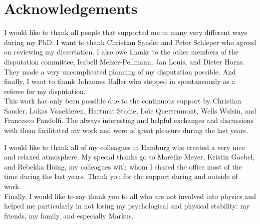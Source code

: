 \chapter*{Acknowledgements}
\vspace{1cm}

I would like to thank all people that supported me in many very different ways during my PhD.
I want to thank Christian Sander and Peter Schleper who agreed on reviewing my dissertation.
I also owe thanks to the other members of the disputation committee, Isabell Melzer-Pellmann, Jan Louis, and Dieter Horns.
They made a very uncomplicated planning of my disputation possible.
And finally, I want to thank Johannes Haller who stepped in spontaneously as a referee for my disputation.\\

This work has only been possible due to the continuous support by Christian Sander, Lukas Vanelderen, Hartmut Stadie, Lo\"{i}c Quertenmont, Wells Wulsin, and Francesco Pandolfi.
The always interesting and helpful exchanges and discussions with them facilitated my work and were of great pleasure during the last years.

I would like to thank all of my colleagues in Hamburg who created a very nice and relaxed atmosphere. 
My special thanks go to Mareike Meyer, Kristin Goebel, and Rebekka H\"{o}ing, my colleagues with whom I shared the office most of the time during the last years. 
Thank you for the support during and outside of work.\\

Finally, I would like to say thank you to all who are not involved into physics and helped me particularly in not losing my psychological and physical stability: my friends, my family, and especially Markus.
